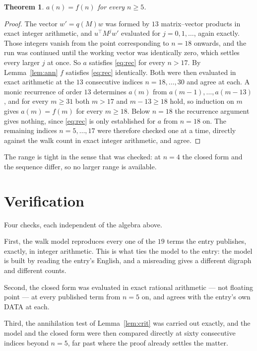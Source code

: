 \documentclass[11pt,a4paper]{article}
\theoremstyle{plain}
\newtheorem{theorem}{Theorem}
\theoremstyle{definition}
\begin{document}
\begin{theorem}
$a(n)=f(n)$ for every $n\ge5$.
\end{theorem}

\begin{proof}
The vector $w'=q(M)w$ was formed by $13$ matrix--vector products in exact integer
arithmetic, and $u^{\!\top}M^{j}w'$ evaluated for $j=0,1,\dots$, again exactly. Those integers
vanish from the point corresponding to $n=18$ onwards, and the run was continued until the
working vector was identically zero, which settles every larger $j$ at once. So $a$ satisfies
\eqref{eq:rec} for every $n>17$. By Lemma~\ref{lem:ann} $f$ satisfies \eqref{eq:rec}
identically. Both were then evaluated in exact arithmetic at the $13$ consecutive indices
$n=18,\dots,30$ and agree at each. A monic recurrence of order $13$
determines $a(m)$ from $a(m-1),\dots,a(m-13)$, and for every $m\ge31$ both
$m>17$ and $m-13\ge18$ hold, so induction on $m$ gives $a(m)=f(m)$ for every
$m\ge18$.
Below $n=18$ the recurrence argument gives nothing, since \eqref{eq:rec} is only
established for $a$ from $n=18$ on. The remaining indices $n=5,\dots,17$ were
therefore checked one at a time, directly against the walk count in exact integer arithmetic,
and agree.
\end{proof}

The range is tight in the sense that was checked: at $n=4$ the closed form and the sequence differ, so no larger range is available.

\section{Verification}

Four checks, each independent of the algebra above.

First, the walk model reproduces every one of the $19$ terms the entry publishes,
exactly, in integer arithmetic. This is what ties the model to the entry: the model is built
by reading the entry's English, and a misreading gives a different digraph and different
counts.

Second, the closed form was evaluated in exact rational arithmetic --- not floating point ---
at every published term from $n=5$ on, and agrees with the entry's own DATA at each.

Third, the annihilation test of Lemma~\ref{lem:crit} was carried out exactly, and the model
and the closed form were then compared directly at sixty consecutive indices beyond
$n=5$, far past where the proof already settles the matter.
\end{document}
